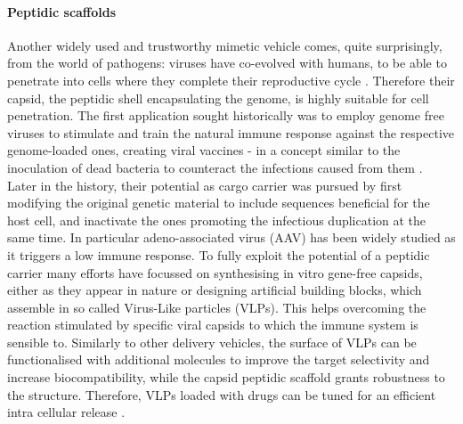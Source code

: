 \paragraph{Peptidic scaffolds} Another widely used and trustworthy mimetic vehicle comes, quite surprisingly, from the world of pathogens: viruses have co-evolved with humans, to be able to penetrate into cells where they complete their reproductive cycle \cite{Lobo2009}. Therefore their capsid, the peptidic shell encapsulating the genome, is highly suitable for cell penetration. The first application sought historically was to employ genome free viruses to stimulate and train the natural immune response against the respective genome-loaded ones, creating viral vaccines - in a concept similar to the inoculation of dead bacteria to counteract the infections caused from them \cite{Lauer2017}.
Later in the history, their potential as cargo carrier was pursued by first modifying the original genetic material to include sequences beneficial for the host cell, and inactivate the ones promoting the infectious duplication at the same time. In particular adeno-associated virus (AAV) has been widely studied \cite{Daya2008} as it triggers a low immune response.
%
To fully exploit the potential of a peptidic carrier many efforts have focussed on synthesising in vitro gene-free capsids, either as they appear in nature \cite{Wu2009} or designing artificial building blocks, which assemble in so called Virus-Like particles (VLPs). This helps overcoming the reaction stimulated by specific viral capsids to which the immune system is sensible to.
%
Similarly to other delivery vehicles, the surface of VLPs can be functionalised with additional molecules to improve the target selectivity and increase biocompatibility, while the capsid peptidic scaffold grants robustness to the structure. Therefore, VLPs loaded with drugs can be tuned for an efficient intra cellular release \cite{Ma2012}.

